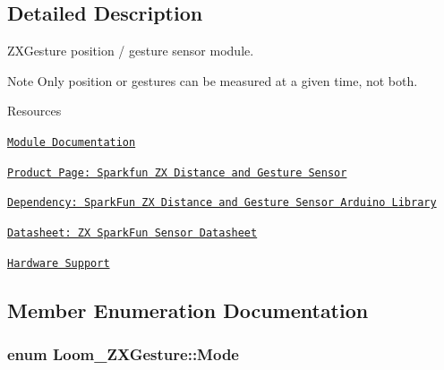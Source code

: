 \subsection{Detailed Description}
Z\+X\+Gesture position / gesture sensor module. 

\begin{DoxyNote}{Note}
Only position or gestures can be measured at a given time, not both.
\end{DoxyNote}
\begin{DoxyParagraph}{Resources}

\begin{DoxyItemize}
\item \href{https://openslab-osu.github.io/Loom/html/class_loom___z_x_gesture.html}{\tt Module Documentation}
\item \href{https://www.sparkfun.com/products/13162}{\tt Product Page\+: Sparkfun ZX Distance and Gesture Sensor}
\item \href{https://github.com/sparkfun/SparkFun_ZX_Distance_and_Gesture_Sensor_Arduino_Library}{\tt Dependency\+: Spark\+Fun ZX Distance and Gesture Sensor Arduino Library}
\item \href{https://cdn.sparkfun.com/assets/learn_tutorials/3/4/5/XYZ_Interactive_Technologies_-_ZX_SparkFun_Sensor_Datasheet.pdf}{\tt Datasheet\+: ZX Spark\+Fun Sensor Datasheet}
\item \href{https://github.com/OPEnSLab-OSU/Loom/wiki/Hardware-Support#zx-distance-and-gesture-sensor}{\tt Hardware Support} 
\end{DoxyItemize}
\end{DoxyParagraph}


\subsection{Member Enumeration Documentation}
\subsubsection[{\texorpdfstring{Mode}{Mode}}]{\setlength{\rightskip}{0pt plus 5cm}enum {\bf Loom\+\_\+\+Z\+X\+Gesture\+::\+Mode}\hspace{0.3cm}{\ttfamily [strong]}}\hypertarget{class_loom___z_x_gesture_a4c381d3f296be2cac6188fd8c5f8b7dd}{}\label{class_loom___z_x_gesture_a4c381d3f296be2cac6188fd8c5f8b7dd}


